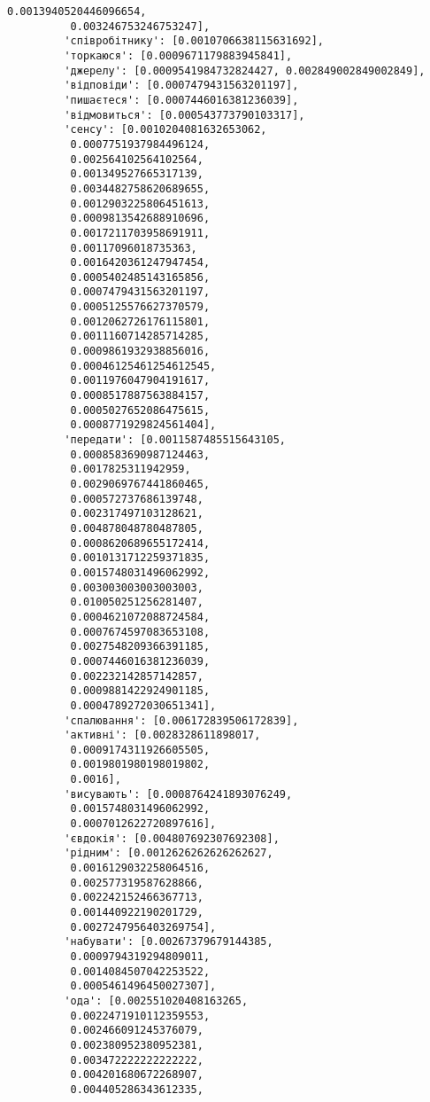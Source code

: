 \documentclass[11pt]{article}
\begin{document}
\begin{Verbatim}[commandchars=\\\{\}]
          0.0013940520446096654,
          0.003246753246753247],
         'співробітнику': [0.0010706638115631692],
         'торкаюся': [0.0009671179883945841],
         'джерелу': [0.0009541984732824427, 0.002849002849002849],
         'відповіди': [0.0007479431563201197],
         'пишаєтеся': [0.0007446016381236039],
         'відмовиться': [0.000543773790103317],
         'сенсу': [0.0010204081632653062,
          0.0007751937984496124,
          0.002564102564102564,
          0.001349527665317139,
          0.0034482758620689655,
          0.0012903225806451613,
          0.0009813542688910696,
          0.0017211703958691911,
          0.00117096018735363,
          0.0016420361247947454,
          0.0005402485143165856,
          0.0007479431563201197,
          0.0005125576627370579,
          0.0012062726176115801,
          0.0011160714285714285,
          0.0009861932938856016,
          0.00046125461254612545,
          0.0011976047904191617,
          0.0008517887563884157,
          0.0005027652086475615,
          0.0008771929824561404],
         'передати': [0.0011587485515643105,
          0.0008583690987124463,
          0.0017825311942959,
          0.0029069767441860465,
          0.000572737686139748,
          0.002317497103128621,
          0.004878048780487805,
          0.0008620689655172414,
          0.0010131712259371835,
          0.0015748031496062992,
          0.003003003003003003,
          0.010050251256281407,
          0.0004621072088724584,
          0.0007674597083653108,
          0.0027548209366391185,
          0.0007446016381236039,
          0.002232142857142857,
          0.0009881422924901185,
          0.0004789272030651341],
         'спалювання': [0.006172839506172839],
         'активні': [0.0028328611898017,
          0.0009174311926605505,
          0.0019801980198019802,
          0.0016],
         'висувають': [0.0008764241893076249,
          0.0015748031496062992,
          0.0007012622720897616],
         'євдокія': [0.004807692307692308],
         'рідним': [0.0012626262626262627,
          0.0016129032258064516,
          0.002577319587628866,
          0.002242152466367713,
          0.001440922190201729,
          0.0027247956403269754],
         'набувати': [0.00267379679144385,
          0.0009794319294809011,
          0.0014084507042253522,
          0.0005461496450027307],
         'ода': [0.002551020408163265,
          0.0022471910112359553,
          0.002466091245376079,
          0.002380952380952381,
          0.003472222222222222,
          0.004201680672268907,
          0.004405286343612335,

\end{Verbatim}
\end{document}
